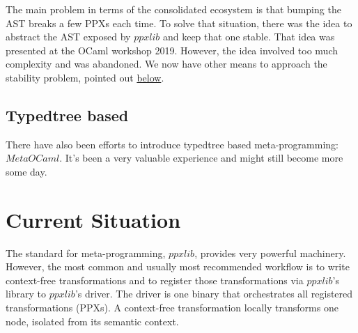 \documentclass[10pt, a4paper, twocolumn]{article}
\begin{document}
The main problem in terms of the consolidated ecosystem is that bumping the AST breaks a few PPXs each time. To solve that situation, there was the idea to abstract the AST exposed by $ppxlib$ and keep that one stable. That idea was presented at the OCaml workshop 2019\cite{workshop2019}. However, the idea involved too much complexity and was abandoned. We now have other means to approach the stability problem, pointed out \hyperref[stability]{below}.
 

\subsection{Typedtree based}

There have also been efforts to introduce typedtree based meta-programming: $MetaOCaml$\cite{metaocaml}. It's been a very valuable experience and might still become more some day.

\section{Current Situation}

The standard for meta-programming, $ppxlib$, provides very powerful machinery.
However, the most common and usually most recommended workflow is to write context-free transformations and to register those transformations via $ppxlib$'s library to $ppxlib$'s driver. The driver is one binary that orchestrates all registered transformations (PPXs). A context-free transformation locally transforms one node, isolated from its semantic context.

\vspace{20pt}
\end{document}
